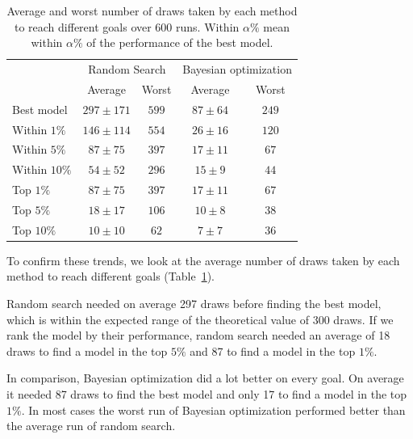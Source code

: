 \begin{table}[htb]
	\centering
	\begin{tabular}{ | l | c | c | c | c | }
		\hline
		 & \multicolumn{2}{|c|}{Random Search} & \multicolumn{2}{|c|}{Bayesian optimization} \\ 
		& Average & Worst & Average & Worst \\
		\hline
		Best model & $297 \pm 171$ & $599$ & $87 \pm 64$ & $249$ \\
		\hline
		Within $1 \%$ & $146 \pm 114$ & $554$ & $26 \pm 16$ & $120$ \\
		Within $5 \%$ & $87 \pm 75$ & $397$ & $17 \pm 11$ & $67$ \\
		Within $10 \%$ & $54 \pm 52$ & $296$ & $15 \pm 9$ & $44$ \\
		\hline
		Top $1 \%$ & $87 \pm 75$ & $397$ & $17 \pm 11$ & $67$ \\
		Top $5 \%$ & $18 \pm 17$ & $106$ & $10 \pm 8$ & $38$ \\
		Top $10 \%$ & $10 \pm 10$ & $62$ & $7 \pm 7$ & $36$ \\
		\hline
	\end{tabular}
	\caption[Average and worst number of draws taken by each method to reach different goals over 600 runs]{Average and worst number of draws taken by each method to reach different goals over 600 runs. Within $\alpha \%$ mean within $\alpha \%$ of the performance of the best model.}
	\label{table:search_average}
\end{table}

To confirm these trends, we look at the average number of draws taken by each method to reach different goals (Table~\ref{table:search_average}).

Random search needed on average 297 draws before finding the best model, which is within the expected range of the theoretical value of 300 draws. If we rank the model by their performance, random search needed an average of 18 draws to find a model in the top $5\%$ and 87 to find a model in the top $1\%$.

In comparison, Bayesian optimization did a lot better on every goal. On average it needed 87 draws to find the best model and only 17 to find a model in the top $1 \%$. In most cases the worst run of Bayesian optimization performed better than the average run of random search.

